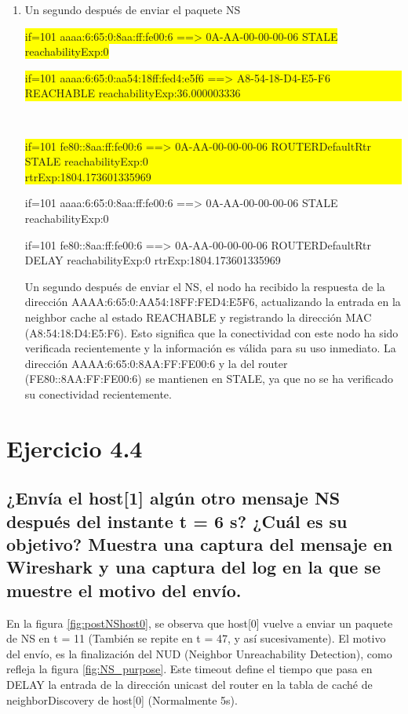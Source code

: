 \begin{enumerate}
    \item Un segundo después de enviar el paquete NS
    
    \colorbox{yellow}{%
            if=101 aaaa:6:65:0:8aa:ff:fe00:6 ==> 0A-AA-00-00-00-06 STALE reachabilityExp:0%
    }\\
    \colorbox{yellow}{%
        \parbox{\linewidth}{%
            if=101 aaaa:6:65:0:aa54:18ff:fed4:e5f6 ==> A8-54-18-D4-E5-F6 REACHABLE reachabilityExp:36.000003336%
        }
    }\\
    \colorbox{yellow}{%
        \parbox{\linewidth}{%
            if=101 fe80::8aa:ff:fe00:6 ==> 0A-AA-00-00-00-06 ROUTERDefaultRtr STALE reachabilityExp:0\\
            rtrExp:1804.173601335969%
        }
    }

    if=101 aaaa:6:65:0:8aa:ff:fe00:6 ==> 0A-AA-00-00-00-06 STALE reachabilityExp:0

    if=101 fe80::8aa:ff:fe00:6 ==> 0A-AA-00-00-00-06 ROUTERDefaultRtr DELAY reachabilityExp:0 rtrExp:1804.173601335969

    Un segundo después de enviar el NS, el nodo ha recibido la respuesta de la dirección AAAA:6:65:0:AA54:18FF:FED4:E5F6, actualizando la entrada en la neighbor cache al estado REACHABLE y registrando la dirección MAC (A8:54:18:D4:E5:F6). Esto significa que la conectividad con este nodo ha sido verificada recientemente y la información es válida para su uso inmediato. La dirección AAAA:6:65:0:8AA:FF:FE00:6 y la del router (FE80::8AA:FF:FE00:6) se mantienen en STALE, ya que no se ha verificado su conectividad recientemente.

\end{enumerate}



\section{Ejercicio 4.4}
\subsection{¿Envía el host[1] algún otro mensaje NS después del instante t = 6 s? ¿Cuál es su objetivo? Muestra una captura del mensaje en Wireshark y una captura del log en la que se muestre el motivo del envío.}

En la figura \ref{fig:postNShost0}, se observa que host[0] vuelve a enviar un paquete de NS en t = 11 (También se repite en t = 47, y así sucesivamente). El motivo del envío, es la finalización del NUD (Neighbor Unreachability Detection), como refleja la figura \ref{fig:NS_purpose}. Este timeout define el tiempo que pasa en DELAY la entrada de la dirección unicast del router en la tabla de caché de neighborDiscovery de host[0] (Normalmente 5s).

